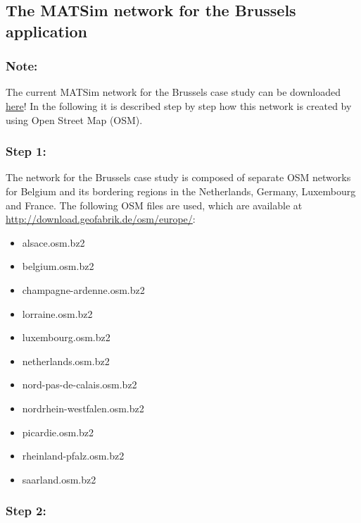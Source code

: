 \subsection{The MATSim network for the Brussels application}

\subsubsection{Note:}

The current MATSim network for the Brussels case study can be downloaded \href{https://svn.vsp.tu-berlin.de/repos/public-svn/matsim/examples/countries/be/brussels/network/belgium_incl_borderArea_hierarchylayer4_clean_simple.xml.gz}{here}! In the following it is described step by step how this network is created by using Open Street Map (OSM).

\subsubsection{Step 1:}

The network for the Brussels case study is composed of separate OSM  networks for Belgium and its bordering regions in the Netherlands,  Germany, Luxembourg and France. The following OSM files are used, which  are available at \href{http://download.geofabrik.de/osm/europe/}{http://download.geofabrik.de/osm/europe/}:
\begin{itemize}
	\item  alsace.osm.bz2
	\item  belgium.osm.bz2
	\item  champagne-ardenne.osm.bz2
	\item  lorraine.osm.bz2
	\item  luxembourg.osm.bz2
	\item  netherlands.osm.bz2
	\item  nord-pas-de-calais.osm.bz2
	\item  nordrhein-westfalen.osm.bz2
	\item  picardie.osm.bz2
	\item  rheinland-pfalz.osm.bz2
	\item  saarland.osm.bz2
\end{itemize}

\subsubsection{Step 2:}

